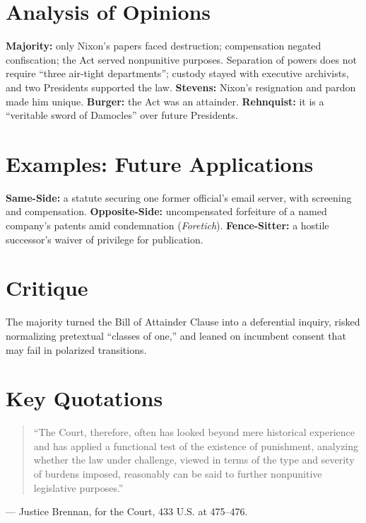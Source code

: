 \documentclass[12pt]{article}
\begin{document}
\section{Analysis of Opinions}
\textbf{Majority:} only Nixon's papers faced destruction; compensation negated confiscation; the Act served nonpunitive purposes. Separation of powers does not require ``three air-tight departments''; custody stayed with executive archivists, and two Presidents supported the law. \textbf{Stevens:} Nixon's resignation and pardon made him unique. \textbf{Burger:} the Act was an attainder. \textbf{Rehnquist:} it is a ``veritable sword of Damocles'' over future Presidents.

\section{Examples: Future Applications}
\textbf{Same-Side:} a statute securing one former official's email server, with screening and compensation. \textbf{Opposite-Side:} uncompensated forfeiture of a named company's patents amid condemnation (\textit{Foretich}). \textbf{Fence-Sitter:} a hostile successor's waiver of privilege for publication.

\section{Critique}
The majority turned the Bill of Attainder Clause into a deferential inquiry, risked normalizing pretextual ``classes of one,'' and leaned on incumbent consent that may fail in polarized transitions.

\section{Key Quotations}
\begin{quote}
``The Court, therefore, often has looked beyond mere historical experience and has applied a functional test of the existence of punishment, analyzing whether the law under challenge, viewed in terms of the type and severity of burdens imposed, reasonably can be said to further nonpunitive legislative purposes.''
\end{quote}
\noindent --- Justice Brennan, for the Court, 433 U.S. at 475--476.
\end{document}
